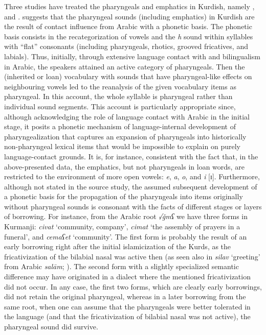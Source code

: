 \documentclass[output=paper]{langsci/langscibook}
\begin{document}
Three studies have treated the pharyngeals and emphatics in Kurdish, namely \citet{Kahn1976}, \citet{Anonbyforthcoming} and \citet{Barryforthcoming}. \citet{Barryforthcoming} suggests that the pharyngeal sounds (including emphatics) in Kurdish are the result of contact influence from Arabic with a phonetic basis. The phonetic basis consists in the recategorization of vowels and the \textit{h} sound within syllables with “flat” consonants (including pharyngeals, rhotics, grooved fricatives, and labials). Thus, initially, through extensive language contact with and bilingualism in Arabic, the speakers attained an active category of pharyngeals. Then the (inherited or loan) vocabulary with sounds that have pharyngeal-like effects on neighbouring vowels led to the reanalysis of the given vocabulary items as pharyngeal. In this account, the whole syllable is pharyngeal rather than individual sound segments. This account is particularly appropriate since, although acknowledging the role of language contact with Arabic in the initial stage, it posits a phonetic mechanism of language-internal development of pharyngealization that captures an expansion of pharyngeals into historically non-pharyngeal lexical items that would be impossible to explain on purely language-contact grounds. It is, for instance, consistent with the fact that, in the above-presented data, the emphatics, but not pharyngeals in loan words, are restricted to the environment of more open vowels: \textit{e}, \textit{a}, \textit{o}, and \textit{i} [ɪ]. Furthermore, although not stated in the source study, the assumed subsequent development of a phonetic basis for the propagation of the pharyngeals into items originally without pharyngeal sounds is consonant with the facts of different stages or layers of borrowing. For instance, from the Arabic root \textit{√ǧmʕ} we have three forms in Kurmanji: \textit{civat} ‘community, company’, \textit{cimat} ‘the assembly of prayers in a funeral’, and \textit{cemaʕet} ‘community’. The first form is probably the result of an early borrowing right after the  initial islamicization of the Kurds, as the fricativization of the bilabial nasal was active then (as seen also in \textit{silav} ‘greeting’ from Arabic \textit{salām}; \citealt{Paul2008}). The second form with a slightly specialized semantic difference may have originated in a dialect where the mentioned fricativization did not occur. In any case, the first two forms, which are clearly early borrowings, did not retain the original pharyngeal, whereas in a later borrowing from the same root, when one can assume that the pharyngeals were better tolerated in the language (and that the fricativization of bilabial nasal was not active), the pharyngeal sound did survive.   
\end{document}
